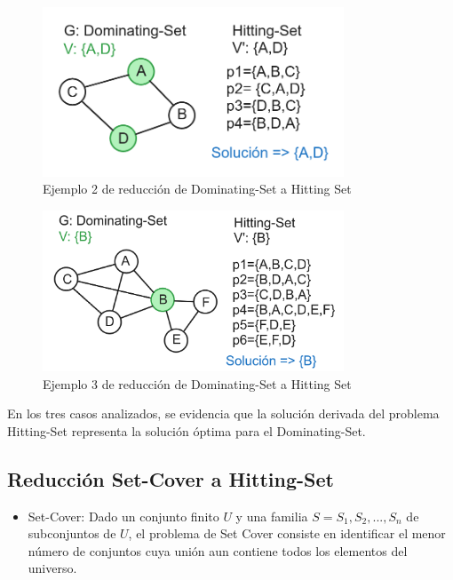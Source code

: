 \begin{figure}[H]
    \centering
    \includegraphics[width=0.8\textwidth]{img/ejemplo2_DS-HS.png}
    \caption{Ejemplo 2 de reducción de Dominating-Set a Hitting Set}
    \label{fig:ejemplo2_DS-HS}
\end{figure}


\begin{figure}[H]
    \centering
    \includegraphics[width=0.8\textwidth]{img/ejemplo3_DS-HS.png}
    \caption{Ejemplo 3 de reducción de Dominating-Set a Hitting Set}
    \label{fig:ejemplo3_DS-HS}
\end{figure}

En los tres casos analizados, se evidencia que la solución derivada del problema Hitting-Set representa la solución óptima para el Dominating-Set.


\subsection{Reducción Set-Cover a Hitting-Set}

\begin{itemize}
    \item Set-Cover: Dado un conjunto finito $U$ y una familia $S= {S_1, S_2, ..., S_n}$ de subconjuntos de $U$, el problema de Set Cover consiste en identificar el menor número de conjuntos cuya unión aun contiene todos los elementos del universo. 
\end{itemize}

